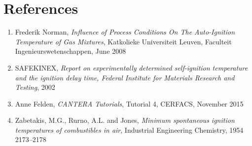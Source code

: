 \documentclass[a4paper]{article}[11pt]
\begin{document}
    \section{References}
    
\begin{enumerate}
\item  Frederik Norman, \textit{Influence of Process Conditions On The Auto-Ignition Temperature of Gas Mixtures}, Katkolieke Universiteit Leuven, Faculteit Ingenieurswetenschappen, June 2008
\item SAFEKINEX, \textit{Report on experimentally determined self-ignition temperature and the ignition delay time, Federal Institute for Materials Research and Testing}, 2002 
\item Anne Felden, \textit{CANTERA Tutorials}, Tutorial 4, CERFACS, November 2015 
\item Zabetakis, M.G., Rurno, A.L. and Jones, \textit{Minimum spontaneous
ignition temperatures of combustibles in air}, Industrial Engineering Chemistry, 1954
2173–2178
\end{enumerate}
    
\end{document}

